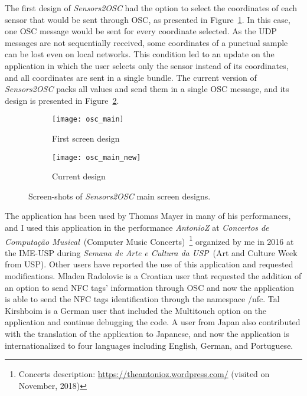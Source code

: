 The first design of \textit{Sensors2OSC} had the option to select the coordinates of each sensor that would be sent through OSC, as presented in Figure~\ref{fig:appsensors2oscfirstdesign}.
In this case, one OSC message would be sent for every coordinate selected.
As the UDP messages are not sequentially received, some coordinates of a punctual sample can be lost even on local networks.
This condition led to an update on the application in which the user selects only the sensor instead of its coordinates, and all coordinates are sent in a single bundle.
The current version of \textit{Sensors2OSC} packs all values and send them in a single OSC message, and its design is presented in Figure~\ref{fig:appsensors2oscseconddesign}.

\begin{figure*}[!ht]
\centering
\begin{subfigure}{.30\textwidth}
	\texttt{[image: osc\_main]}
    \caption{First screen design}
	\label{fig:appsensors2oscfirstdesign}
\end{subfigure}
\begin{subfigure}{.28\textwidth}
	\texttt{[image: osc\_main\_new]}
	\caption{Current design}
	\label{fig:appsensors2oscseconddesign}
\end{subfigure}

\caption{Screen-shots of \textit{Sensors2OSC} main screen designs.}
\label{fig:sensors2oscmainscreen}
\end{figure*}

The application has been used by Thomas Mayer in many of his performances, and I used this application in the performance \textit{AntonioZ} at \textit{Concertos de Computação Musical}~(Computer Music Concerts)~\footnote{Concerts description: \url{https://theantonioz.wordpress.com/} (visited on November, 2018)} organized by me in 2016 at the IME-USP during \textit{Semana de Arte e Cultura da USP}~(Art and Culture Week from USP).
Other users have reported the use of this application and requested modifications.
Mladen Radolovic is a Croatian user that requested the addition of an option to send NFC tags' information through OSC and now the application is able to send the NFC tags identification through the namespace /nfc.
Tal Kirshboim is a German user that included the Multitouch option on the application and continue debugging the code. %
A user from Japan also contributed with the translation of the application to Japanese, and now the application is internationalized to four languages including English, German, and Portuguese.

